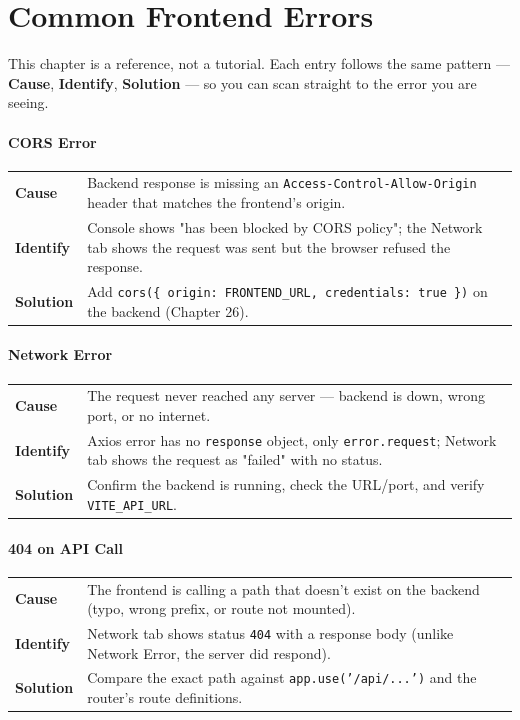\chapter{Common Frontend Errors}

\begin{notebox}[NOTE]
This chapter is a reference, not a tutorial. Each entry follows the same
pattern --- \textbf{Cause}, \textbf{Identify}, \textbf{Solution} --- so you
can scan straight to the error you are seeing.
\end{notebox}

\subsubsection*{CORS Error}
\noindent\begin{tabularx}{\textwidth}{@{}>{\bfseries}p{2.3cm}X@{}}
\toprule
Cause & Backend response is missing an \texttt{Access-Control-Allow-Origin}
header that matches the frontend's origin. \\
Identify & Console shows "has been blocked by CORS policy"; the Network
tab shows the request was sent but the browser refused the response. \\
Solution & Add \texttt{cors(\{ origin: FRONTEND\_URL, credentials: true \})}
on the backend (Chapter 26). \\
\bottomrule
\end{tabularx}

\subsubsection*{Network Error}
\noindent\begin{tabularx}{\textwidth}{@{}>{\bfseries}p{2.3cm}X@{}}
\toprule
Cause & The request never reached any server --- backend is down, wrong
port, or no internet. \\
Identify & Axios error has no \texttt{response} object, only
\texttt{error.request}; Network tab shows the request as "failed"
with no status. \\
Solution & Confirm the backend is running, check the URL/port, and
verify \texttt{VITE\_API\_URL}. \\
\bottomrule
\end{tabularx}

\subsubsection*{404 on API Call}
\noindent\begin{tabularx}{\textwidth}{@{}>{\bfseries}p{2.3cm}X@{}}
\toprule
Cause & The frontend is calling a path that doesn't exist on the backend
(typo, wrong prefix, or route not mounted). \\
Identify & Network tab shows status \texttt{404} with a response body
(unlike Network Error, the server did respond). \\
Solution & Compare the exact path against \texttt{app.use('/api/...')}
and the router's route definitions. \\
\bottomrule
\end{tabularx}

